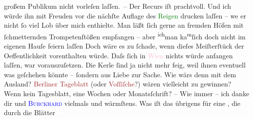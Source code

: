                großem Publikum nicht vorleſen laſſen. –\pend
           \pstart
           Der Recurs iſt prachtvoll. Und ich würde ihn mit Freuden vor die nächſte {\pb}Auflage des \textcolor{green}{Reigen}{}\ledrightnote{\textcolor{green}{Reigen. Zehn Dialoge}} drucken laſſen – we{\geminationn} er nicht ſo viel Lob über mich enthielte. Man läßt
               ſich gerne an fremden Höfen mit ſchmetternden Trompetenſtößen empfangen – aber \substVorne{}\textsuperscript{ich}\substDazwischen{}man\substHinten{} ka{\geminationn}\substVorne{}\textsuperscript{m}\substDazwischen{}ſ\substHinten{}ich doch nicht im eigenen Hauſe feiern laſſen{\dotstwo}
               Doch wäre es zu ſchade, wenn dieſes Meiſterſtück der Oeffentlichkeit vorenthalten
               würde. Daſs ſich in \textcolor{pink}{Wien}{}\ledrightnote{\textcolor{pink}{Wien}} nichts würde anfangen
               laſſen, war vorauszuſetzen. Die Kerle ſind ja nicht mehr feig, weil ihnen even{\pb}tuell was geſchehen
               könnte – ſondern aus Liebe zur Sache. Wie wärs denn mit dem Ausland? \textcolor{brown}{Berliner Tageblatt}{}\ledrightnote{\textcolor{brown}{Berliner Tageblatt}} (oder \textcolor{brown}{Voſſiſche}{}\ledrightnote{\textcolor{brown}{Vossische Zeitung}}?) wären vielleicht zu gewinnen? Wenn kein Tagesblatt, eine Wochen
               oder Monatsſchrift? – Wie immer – ich danke dir und \textsc{\textcolor{blue}{Burckhard}{}\ledrightnote{\textcolor{blue}{Max Eugen Burckhard}}} vielmals und wärmſtens. Was iſt das übrigens für eine \label{K_L01338_1v}\label{K_L01338_1h}, die durch die Blätter
